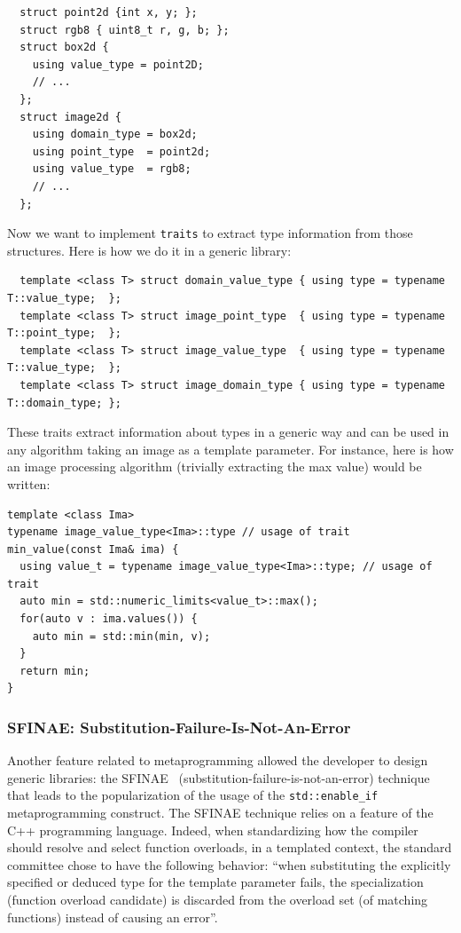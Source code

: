 \begin{verbatim}
  struct point2d {int x, y; };
  struct rgb8 { uint8_t r, g, b; };
  struct box2d {
    using value_type = point2D;
    // ...
  };
  struct image2d {
    using domain_type = box2d;
    using point_type  = point2d;
    using value_type  = rgb8;
    // ...
  };
\end{verbatim}

Now we want to implement \texttt{traits} to extract type information from those structures. Here is how we do it in a
generic library:

\begin{verbatim}
  template <class T> struct domain_value_type { using type = typename T::value_type;  };
  template <class T> struct image_point_type  { using type = typename T::point_type;  };
  template <class T> struct image_value_type  { using type = typename T::value_type;  };
  template <class T> struct image_domain_type { using type = typename T::domain_type; };
\end{verbatim}

These traits extract information about types in a generic way and can be used in any algorithm taking an image as a
template parameter. For instance, here is how an image processing algorithm (trivially extracting the max value) would
be written:

\begin{verbatim}
template <class Ima>
typename image_value_type<Ima>::type // usage of trait
min_value(const Ima& ima) {
  using value_t = typename image_value_type<Ima>::type; // usage of trait
  auto min = std::numeric_limits<value_t>::max();
  for(auto v : ima.values()) {
    auto min = std::min(min, v);
  }
  return min;
}
\end{verbatim}

\subsubsection{SFINAE: Substitution-Failure-Is-Not-An-Error}
\label{subsec:sfinae}

Another feature related to metaprogramming allowed the developer to design generic libraries: the
SFINAE~\parencite{vandevoorde.2002.c++} (substitution-failure-is-not-an-error) technique that leads to the
popularization of the usage of the \texttt{std::enable\_if} metaprogramming construct. The SFINAE technique relies on a
feature of the C++ programming language. Indeed, when standardizing how the compiler should resolve and select function
overloads, in a templated context, the standard committee chose to have the following behavior: ``when substituting the
explicitly specified or deduced type for the template parameter fails, the specialization (function overload candidate)
is discarded from the overload set (of matching functions) instead of causing an error''.

